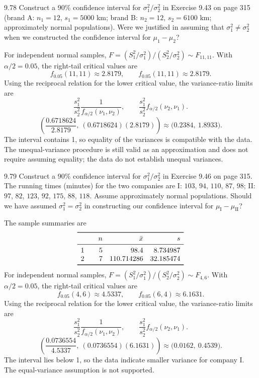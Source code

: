 \documentclass[11pt,oneside]{article}
\begin{document}
\begin{exercise}{9.78}
Construct a 90\% confidence interval for $\sigma_1^2/\sigma_2^2$ in Exercise 9.43 on page 315 (brand A: $n_1=12$, $s_1=5000$ km; brand B: $n_2=12$, $s_2=6100$ km; approximately normal populations). Were we justified in assuming that $\sigma_1^2\ne\sigma_2^2$ when we constructed the confidence interval for $\mu_1-\mu_2$?
\end{exercise}
\begin{solution}
For independent normal samples, $F=(S_1^2/\sigma_1^2)/(S_2^2/\sigma_2^2)\sim F_{11,11}$. With $\alpha/2=0.05$, the right-tail critical values are
\[
f_{0.05}(11,11)\approx2.8179,\qquad f_{0.05}(11,11)\approx2.8179.
\]
Using the reciprocal relation for the lower critical value, the variance-ratio limits are
\[
\frac{s_1^2}{s_2^2}\frac1{f_{\alpha/2}(\nu_1,\nu_2)},\qquad\frac{s_1^2}{s_2^2}f_{\alpha/2}(\nu_2,\nu_1).
\]
\[
\left(\frac{0.6718624}{2.8179},\ (0.6718624)(2.8179)\right)\approx\boxed{\bigl(0.2384,\ 1.8933\bigr)}.
\]
The interval contains 1, so equality of the variances is compatible with the data. The unequal-variance procedure is still valid as an approximation and does not require assuming equality; the data do not establish unequal variances.
\end{solution}

\begin{exercise}{9.79}
Construct a 90\% confidence interval for $\sigma_1^2/\sigma_2^2$ in Exercise 9.46 on page 315. The running times (minutes) for the two companies are I: $103$, $94$, $110$, $87$, $98$; II: $97$, $82$, $123$, $92$, $175$, $88$, $118$. Assume approximately normal populations. Should we have assumed $\sigma_1^2=\sigma_2^2$ in constructing our confidence interval for $\mu_{\mathrm I}-\mu_{\mathrm{II}}$?
\end{exercise}
\begin{solution}
The sample summaries are
\[
\begin{array}{c@{\qquad}rrr}\toprule &n&\bar x&s\\\midrule 1&5&98.4&8.734987\\2&7&110.714286&32.185474\\\bottomrule\end{array}
\]
For independent normal samples, $F=(S_1^2/\sigma_1^2)/(S_2^2/\sigma_2^2)\sim F_{4,6}$. With $\alpha/2=0.05$, the right-tail critical values are
\[
f_{0.05}(4,6)\approx4.5337,\qquad f_{0.05}(6,4)\approx6.1631.
\]
Using the reciprocal relation for the lower critical value, the variance-ratio limits are
\[
\frac{s_1^2}{s_2^2}\frac1{f_{\alpha/2}(\nu_1,\nu_2)},\qquad\frac{s_1^2}{s_2^2}f_{\alpha/2}(\nu_2,\nu_1).
\]
\[
\left(\frac{0.0736554}{4.5337},\ (0.0736554)(6.1631)\right)\approx\boxed{\bigl(0.0162,\ 0.4539\bigr)}.
\]
The interval lies below 1, so the data indicate smaller variance for company I. The equal-variance assumption is not supported.
\end{solution}
\end{document}
